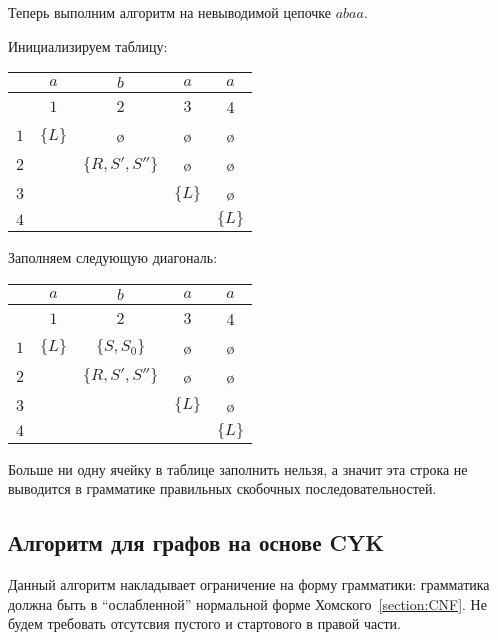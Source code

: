 \begin{example}
  Теперь выполним алгоритм на невыводимой цепочке $abaa$. 

  Инициализируем таблицу:

  \begin{center}
    \begin{tabular}{c||cc|cc}
      & $a$ & $b$ & $a$ & $a$ \\ \hline
      & $1$ & $2$ & $3$ & 4 \\ \hline \hline 
    $1$ & $\{L\}$ & \o & \o & \o \\ 
    $2$ &   & $\{R, S', S''\}$ & \o & \o \\ 
    $3$ &   &   & $\{L\}$ & \o \\ \hline
    $4$ &   &   &   & $\{L\}$ \\ 
    \end{tabular}
  \end{center}

  Заполняем следующую диагональ: 

  \begin{center}
    \begin{tabular}{c||cc|cc}
      & $a$ & $b$ & $a$ & $a$ \\ \hline
      & $1$ & $2$ & $3$ & 4 \\ \hline \hline 
    $1$ & $\{L\}$ & $\{S, S_0\}$ & \o & \o \\ 
    $2$ &   & $\{R, S', S''\}$ & \o & \o \\ 
    $3$ &   &   & $\{L\}$ & \o \\ \hline
    $4$ &   &   &   & $\{L\}$ \\ 
    \end{tabular}
  \end{center}


  Больше ни одну ячейку в таблице заполнить нельзя, а значит эта строка не выводится в грамматике правильных скобочных последовательностей. 

\end{example}

\subsection{Алгоритм для графов на основе CYK}
\label{graph:CYK}

Данный алгоритм накладывает ограничение на форму грамматики: грамматика должна быть в ``ослабленной'' нормальной форме Хомского~\ref{section:CNF}.
Не будем требовать отсутсвия пустого и стартового в правой части.

